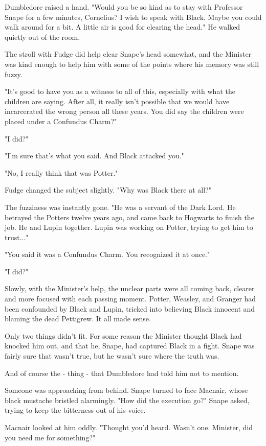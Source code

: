 \documentclass[a4paper,11pt]{article}
\begin{document}
Dumbledore raised a hand. "Would you be so kind as to stay with Professor Snape for a few minutes, Cornelius? I wish to speak with Black. Maybe you could walk around for a bit. A little air is good for clearing the head." He walked quietly out of the room.

The stroll with Fudge did help clear Snape's head somewhat, and the Minister was kind enough to help him with some of the points where his memory was still fuzzy.

"It's good to have you as a witness to all of this, especially with what the children are saying. After all, it really isn't possible that we would have incarcerated the wrong person all these years. You did say the children were placed under a Confundus Charm?"

"I did?"

"I'm sure that's what you said. And Black attacked you."

"No, I really think that was Potter."

Fudge changed the subject slightly. "Why was Black there at all?"

The fuzziness was instantly gone. "He was a servant of the Dark Lord. He betrayed the Potters twelve years ago, and came back to Hogwarts to finish the job. He and Lupin together. Lupin was working on Potter, trying to get him to trust..."

"You said it was a Confundus Charm. You recognized it at once."

"I did?"

Slowly, with the Minister's help, the unclear parts were all coming back, clearer and more focused with each passing moment. Potter, Weasley, and Granger had been confounded by Black and Lupin, tricked into believing Black innocent and blaming the dead Pettigrew. It all made sense.

Only two things didn't fit. For some reason the Minister thought Black had knocked him out, and that he, Snape, had captured Black in a fight. Snape was fairly sure that wasn't true, but he wasn't sure where the truth was.

And of course the - thing - that Dumbledore had told him not to mention.

Someone was approaching from behind. Snape turned to face Macnair, whose black mustache bristled alarmingly. "How did the execution go?" Snape asked, trying to keep the bitterness out of his voice.

Macnair looked at him oddly. "Thought you'd heard. Wasn't one. Minister, did you need me for something?"
\end{document}

